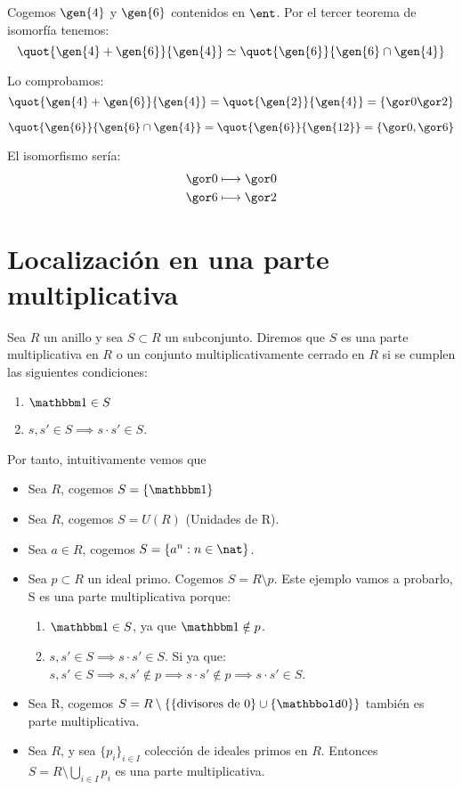 \begin{example}
	Cogemos $\gen{4}$ y $\gen{6}$ contenidos en $\ent$. Por el tercer teorema de isomorfía tenemos:
	$$ \quot{\gen{4}+\gen{6}}{\gen{4}}\simeq \quot{\gen{6}}{\gen{6} \cap \gen{4}} $$

	Lo comprobamos:
	$$\quot{\gen{4}+\gen{6}}{\gen{4}} = \quot{\gen{2}}{\gen{4}}=\{ \cls{0} \cls{2} \}$$

	$$ \quot{\gen{6}}{\gen{6} \cap \gen{4}} = \quot{\gen{6}}{\gen{12}} = \{ \cls{0}, \cls{6} \}$$

	El isomorfismo sería:
	\begin{align*}
		\cls{0}  & \longmapsto  \cls{0}\\
		\cls{6} & \longmapsto \cls{2} \\
	\end{align*}
\end{example}

\section{Localización en una parte multiplicativa}
\begin{defn}
	Sea $R$ un anillo y sea $S\subset R$ un subconjunto. Diremos que $S$ es una parte multiplicativa en $R$ o un conjunto multiplicativamente cerrado en $R$ si se cumplen las siguientes condiciones:
	\begin{enumerate}
		\item $\one \in S$
		\item $s,s' \in S \implies s\cdot s' \in S$.
	\end{enumerate}
\end{defn}

Por tanto, intuitivamente vemos que

\begin{example}
	\begin{itemize}
		\item Sea $R$, cogemos $S=\{\one \}$
		\item Sea $R$, cogemos $S=U(R)$ (Unidades de R).
		\item Sea $a \in R$, cogemos $S=\{ a^n: n \in \nat \}$.
		\item Sea $p \subset R$ un ideal primo. Cogemos $S=R \setminus p$. Este ejemplo vamos a probarlo, S es una parte multiplicativa porque:
		\begin{enumerate}
			\item $\one \in S$, ya que $\one \notin p$.
			\item $s,s' \in S \implies s\cdot s' \in S$. Si ya que: $s,s' \in S \implies s,s' \notin p \implies s\cdot s' \notin p \implies s\cdot s' \in S$.
		\end{enumerate}
		\item Sea R, cogemos $S= R \setminus \{\{ \text{divisores de 0}\}\cup \{ \zero \} \}$ también es parte multiplicativa.
		\item Sea $R$, y sea $\{p_i\}_{i\in I}$ colección de ideales primos en $R$. Entonces $S=R\setminus \bigcup_{i\in I}p_i$ es una parte multiplicativa.
	\end{itemize}
\end{example}

